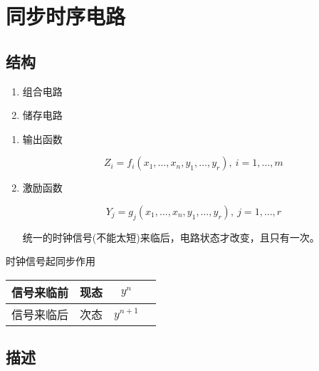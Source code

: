 \chapter{同步时序电路}
\newpage

\section{结构}

\begin{enumerate}

    \item 组合电路
    \item 储存电路

\end{enumerate}

\begin{enumerate}

    \item 输出函数

          \begin{equation}
              Z_i=f_i(x_1,\dots,x_n,y_1,\dots,y_r),~i=1,\dots,m
          \end{equation}

    \item 激励函数

          \begin{equation}
              Y_j=g_j(x_1,\dots,x_n,y_1,\dots,y_r),~j=1,\dots,r
          \end{equation}

          统一的时钟信号(不能太短)来临后，电路状态才改变，且只有一次。

\end{enumerate}

\newpage

时钟信号起同步作用

\begin{table}[!htbp]
    \centering
    \begin{tabular}{lccc}
        \toprule
        信号来临前 & 现态 & $y^{n}$   \\
        \midrule
        信号来临后 & 次态 & $y^{n+1}$ \\
        \bottomrule
    \end{tabular}
\end{table}

\section{描述}


